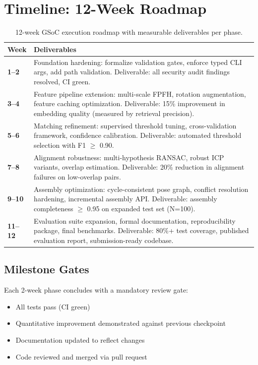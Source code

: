 \documentclass[11pt,a4paper]{article}
\begin{document}
\section{Timeline: 12-Week Roadmap}

\begin{table}[htbp]
\centering
\begin{tabularx}{\textwidth}{lX}
\toprule
\textbf{Week} & \textbf{Deliverables} \\
\midrule
\textbf{1--2} & Foundation hardening: formalize validation gates, enforce typed CLI args, add path validation. Deliverable: all security audit findings resolved, CI green. \\[0.3em]
\textbf{3--4} & Feature pipeline extension: multi-scale FPFH, rotation augmentation, feature caching optimization. Deliverable: 15\% improvement in embedding quality (measured by retrieval precision). \\[0.3em]
\textbf{5--6} & Matching refinement: supervised threshold tuning, cross-validation framework, confidence calibration. Deliverable: automated threshold selection with F1 $\geq$ 0.90. \\[0.3em]
\textbf{7--8} & Alignment robustness: multi-hypothesis RANSAC, robust ICP variants, overlap estimation. Deliverable: 20\% reduction in alignment failures on low-overlap pairs. \\[0.3em]
\textbf{9--10} & Assembly optimization: cycle-consistent pose graph, conflict resolution hardening, incremental assembly API. Deliverable: assembly completeness $\geq$ 0.95 on expanded test set (N=100). \\[0.3em]
\textbf{11--12} & Evaluation suite expansion, formal documentation, reproducibility package, final benchmarks. Deliverable: 80\%+ test coverage, published evaluation report, submission-ready codebase. \\
\bottomrule
\end{tabularx}
\caption{12-week GSoC execution roadmap with measurable deliverables per phase.}
\label{tab:timeline}
\end{table}

\subsection{Milestone Gates}

Each 2-week phase concludes with a mandatory review gate:
\begin{itemize}
    \item All tests pass (CI green)
    \item Quantitative improvement demonstrated against previous checkpoint
    \item Documentation updated to reflect changes
    \item Code reviewed and merged via pull request
\end{itemize}
\end{document}
